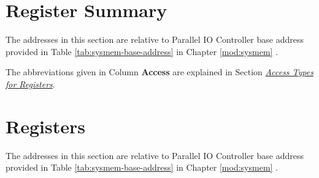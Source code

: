 \documentclass[main\_\_EN.tex]{subfiles}
\begin{document}



\newpage
\hypertarget{parlio-reg-summ}{}
\section{Register Summary}
\label{sec:parlio-reg-summ}

The addresses in this section are relative to Parallel IO Controller base address provided in Table \ref{tab:sysmem-base-address} in Chapter \ref{mod:sysmem} \textit{}.

The abbreviations given in Column \textbf{Access} are explained in Section \hyperref[glossary-access-types]{\textit{Access Types for Registers}}.






\newpage
\section{Registers}

The addresses in this section are relative to Parallel IO Controller base address provided in Table \ref{tab:sysmem-base-address} in Chapter \ref{mod:sysmem} \textit{}.


\end{document}
